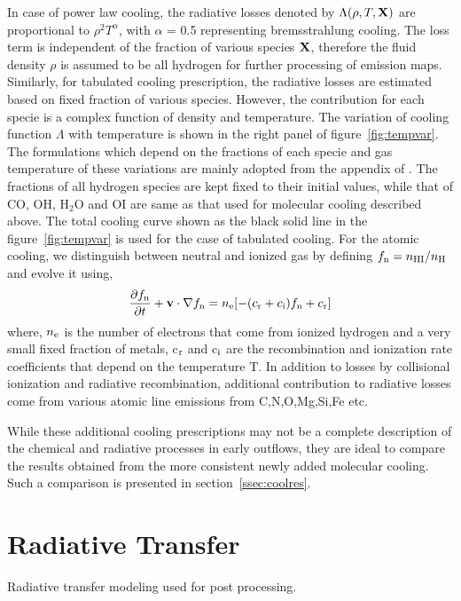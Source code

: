 \documentclass[useAMS,usenatbib,letters]{mn2e}
\begin{document}
In case of power law cooling, the radiative losses denoted by
$\Lambda(\rho,T,\bf{X})$ are proportional to
$\rho^{2}T^{\alpha}$, with $\alpha$ = 0.5 representing bremsstrahlung
cooling. The loss term is independent of the fraction of various
species $\bf{X}$, therefore the fluid density $\rho$ is assumed to be
all hydrogen for further processing of emission maps. Similarly, 
for tabulated cooling prescription, the radiative losses are estimated
based on fixed fraction of various species. However, the contribution
for each specie is a complex function of density and temperature. The
variation of cooling function $\Lambda$ with temperature is shown in
the right panel of figure~\ref{fig:tempvar}. 
The formulations which depend on the fractions of each specie and gas
temperature of these variations are mainly adopted from the appendix of \cite{Smith:2003p9985}. 
The fractions of all hydrogen species are kept fixed to their initial values, while that
of CO, OH, H$_{2}$O and OI are same as that used for molecular cooling
described above. The total cooling curve shown as the black solid line
in the figure~\ref{fig:tempvar} is used for the case of tabulated
cooling. For the atomic cooling, we distinguish between neutral
and ionized gas by defining $f_{\rm n} = n_{\rm HI}/n_{\rm H}$ and
evolve it using,
\begin{equation}
\frac{\partial f_{\rm n}}{\partial t} + {\bf{v}}\cdot\nabla f_{\rm n} =
n_{\rm e} [-(c_{\rm r} + c_{\rm i})f_{\rm n} + c_{\rm r}]
\end{equation}
where, $n_{\rm e}$ is the number of electrons that come from ionized
hydrogen and a very small fixed fraction of metals, c$_{\rm r}$ and c$_{\rm i}$ are the recombination and
ionization rate coefficients that depend on the temperature T. In
addition to losses by collisional ionization and radiative
recombination, additional contribution to radiative losses come from various atomic line emissions from
C,N,O,Mg,Si,Fe etc.
%

While these additional cooling prescriptions may not be a complete description of
the chemical and radiative processes in early outflows, they are ideal
to compare the results obtained from the more consistent newly added molecular
cooling. Such a comparison is presented in section~\ref{ssec:coolres}.


\section{Radiative Transfer}
\label{sec:radtrans}
Radiative transfer modeling used for post processing.
\end{document}

